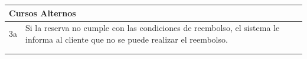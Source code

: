         \begin{table}[H]
            \begin{tabular}{llllllll}
        \hline
        \multicolumn{8}{|l|}{\cellcolor[HTML]{F2F2F2}Cursos Alternos}                                                                                                                                                                                                                                                                                \\ \hline
        \multicolumn{1}{|c|}{3a} & \multicolumn{7}{p{15cm}|}{{\color[HTML]{808080} Si la reserva no cumple con las condiciones de reembolso, el sistema le informa al cliente que no se puede realizar el reembolso.}}                                                                                                                                      \\ \hline
        \multicolumn{1}{c}{}     & \multicolumn{7}{l}{}                                                                                                                                                                                                                                                                                              \\                                                                                                    &                                                                 &                            &                            &                          &                          &                        
        \end{tabular}
        \end{table}

